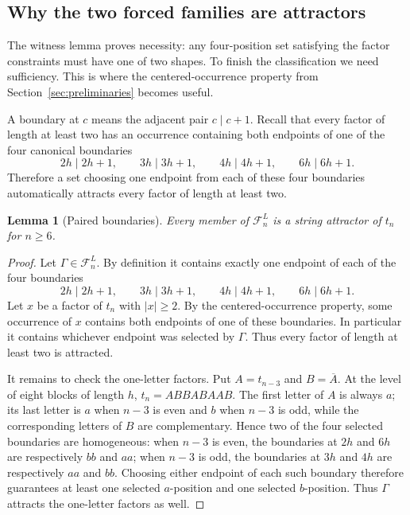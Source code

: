 \documentclass[10pt,a4paper]{article}
\newtheorem{lemma}[theorem]{Lemma}
\theoremstyle{definition}\newtheorem{definition}[theorem]{Definition}
\theoremstyle{remark}\newtheorem{remark}[theorem]{Remark}
\newcommand{\FL}{\mathcal{F}^{L}}
\begin{document}
\subsection{Why the two forced families are attractors}
\label{subsec:sufficiency-stable}

The witness lemma proves necessity: any four-position set satisfying the factor constraints must have one of two shapes.  To finish the classification we need sufficiency.  This is where the centered-occurrence property from Section~\ref{sec:preliminaries} becomes useful.

A boundary at $c$ means the adjacent pair $c\mid c+1$.  Recall that every factor of length at least two has an occurrence containing both endpoints of one of the four canonical boundaries
\[
 2h\mid2h+1,\qquad
 3h\mid3h+1,\qquad
 4h\mid4h+1,\qquad
 6h\mid6h+1.
\]
Therefore a set choosing one endpoint from each of these four boundaries automatically attracts every factor of length at least two.

\begin{lemma}[Paired boundaries]
\label{lem:paired-boundaries}
Every member of $\FL_n$ is a string attractor of $t_n$ for $n\ge6$.
\end{lemma}

\begin{proof}
Let $\Gamma\in\FL_n$.  By definition it contains exactly one endpoint of each of the four boundaries
\[
 2h\mid2h+1,\qquad 3h\mid3h+1,\qquad
 4h\mid4h+1,\qquad 6h\mid6h+1.
\]
Let $x$ be a factor of $t_n$ with $|x|\ge2$.  By the centered-occurrence property, some occurrence of $x$ contains both endpoints of one of these boundaries.  In particular it contains whichever endpoint was selected by $\Gamma$.  Thus every factor of length at least two is attracted.

It remains to check the one-letter factors.  Put $A=t_{n-3}$ and $B=\overline{A}$.  At the level of eight blocks of length $h$,
$
t_n=ABBABAAB.
$
The first letter of $A$ is always $a$; its last letter is $a$ when $n-3$ is even and $b$ when $n-3$ is odd, while the corresponding letters of $B$ are complementary.  Hence two of the four selected boundaries are homogeneous: when $n-3$ is even, the boundaries at $2h$ and $6h$ are respectively $bb$ and $aa$; when $n-3$ is odd, the boundaries at $3h$ and $4h$ are respectively $aa$ and $bb$.  Choosing either endpoint of each such boundary therefore guarantees at least one selected $a$-position and one selected $b$-position.  Thus $\Gamma$ attracts the one-letter factors as well.
\end{proof}
\end{document}
